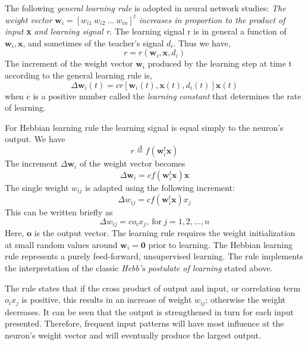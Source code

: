 \documentclass[letterpaper]{article}
\numberwithin{equation}{section}
\begin{document}
The following \textit{general learning rule} is adopted in neural network studies: \textit{The weight vector} \( \textbf{w}_i = [w_{i1} \> w_{i2} \> ... \> w_{in}]^t \) \textit{increases in proportion to the product of input} \textbf{x} \textit{and learning signal r}. The learning signal r is in general a function of \(\textbf{w}_i,\textbf{x}\), and sometimes of the teacher's signal \(d_i\). Thus we have, 
\begin{equation}
	r = r(\textbf{w}_i,\textbf{x},d_i)
\end{equation}
The increment of the weight vector \(\textbf{w}_i\) produced by the learning step at time t according to the general learning rule is,
\begin{equation}
	\Delta\textbf{w}_i(t)=cr[\textbf{w}_i(t),\textbf{x}(t),d_i(t)]\textbf{x}(t)
\end{equation}
when c is a positive number called the \textit{learning constant} that determines the rate of learning.

For Hebbian learning rule the learning signal is equal simply to the neuron's output. We have
\begin{equation}
	r \overset{\Delta}{=} f(\textbf{w}_i^t \textbf{x})
\end{equation}
The increment \(\Delta\textbf{w}_i\) of the weight vector becomes
\begin{equation}
	\Delta\textbf{w}_i = cf(\textbf{w}_i^t \textbf{x})\textbf{x}
\end{equation}
The single weight \( w_{ij} \) is adapted using the following increment:
\begin{equation}
	\Delta\textit{w}_{ij} = cf(\textbf{w}_i^t \textbf{x})x_j
\end{equation}
This can be written briefly as 
\begin{equation}
	\Delta\textit{w}_{ij} = c o_i x_j, \> \text{for} \> j = 1, 2, ..., n
\end{equation}
Here, \(\textbf{o}\) is the output vector. The learning rule requires the weight initialization at small random values around \( \textbf{w}_i = \textbf{0}\) prior to learning. The Hebbian learning rule represents a purely feed-forward, unsupervised learning. The rule implements the interpretation of the classic \textit{Hebb's postulate of learning} stated above. 

The rule states that if the cross product of output and input, or correlation term \(o_ix_j\) is positive, this results in an increase of weight \(w_{ij}\); otherwise the weight decreases. It can be seen that the output is strengthened in turn for each input presented. Therefore, frequent input patterns will have most influence at the neuron's weight vector and will eventually produce the largest output.
\end{document}
